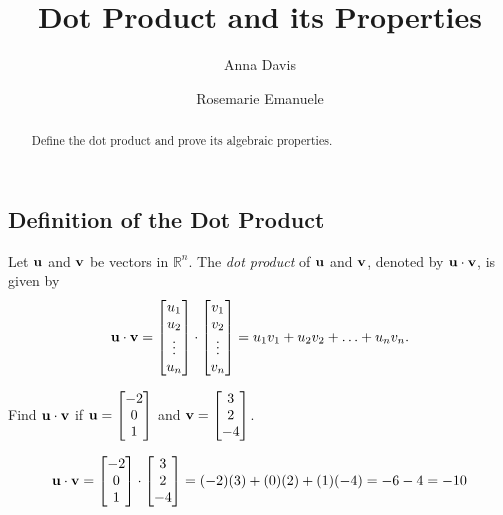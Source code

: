 \documentclass{ximera}
\author{Anna Davis \and Rosemarie Emanuele} \title{Dot Product and its Properties} \license{CC-BY 4.0}
\renewcommand{\vec}[1]{{\bf #1}}
\newcommand{\RR}{\mathbb{R}}
\newcommand{\dfn}{\textit}
\newcommand{\dotp}{\cdot}
\begin{document}
\begin{abstract}
  Define the dot product and prove its algebraic properties.
\end{abstract}
\maketitle

\subsection*{Definition of the Dot Product}

\begin{definition}
  Let $\vec{u}$ and $\vec{v}$ be vectors in $\RR^n$.  The \dfn{dot
    product} of $\vec{u}$ and $\vec{v}$, denoted by
  $\vec{u}\dotp \vec{v}$, is given by
  \begin{align*}
    \vec{u}\dotp\vec{v}=\begin{bmatrix}u_1\\u_2\\\vdots\\u_n\end{bmatrix}\dotp\begin{bmatrix}v_1\\v_2\\\vdots\\v_n\end{bmatrix}=u_1v_1+u_2v_2+\ldots+u_nv_n.
  \end{align*}
\end{definition}

\begin{example}\label{dotex}
  Find $\vec{u}\dotp \vec{v}$ if
  $\vec{u}=\begin{bmatrix}-2\\0\\1\end{bmatrix}$ and
  $\vec{v}=\begin{bmatrix}3\\2\\-4\end{bmatrix}$.

  \begin{explanation}
    $$\vec{u}\dotp\vec{v}=\begin{bmatrix}-2\\0\\1\end{bmatrix}\dotp\begin{bmatrix}3\\2\\-4\end{bmatrix}=(-2)(3)+(0)(2)+(1)(-4)=-6-4=-10$$
  \end{explanation}
\end{example}
\end{document}
